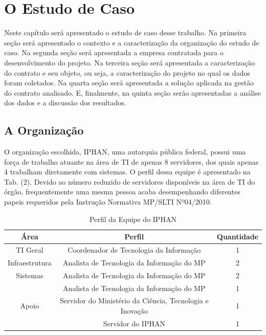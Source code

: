 \chapter[O Estudo de Caso]{O Estudo de Caso}

Neste capítulo será apresentado o estudo de caso desse trabalho. Na primeira seção será apresentado o contexto e a caracterização da organização do estudo de caso. Na segunda seção será apresentada a empresa contratada para o desenvolvimento do projeto. Na terceira seção será apresentada a caracterização do contrato e seu objeto, ou seja, a caracterização do projeto no qual os dados foram coletados. Na quarta seção será apresentada a solução aplicada na gestão do contrato analisado. E, finalmente, na quinta seção serão apresentadas a análise dos dados e a discussão dos resultados.

\section[A Organização]{A Organização}

O organização escolhida, IPHAN, uma autarquia pública federal, possui uma força de trabalho atuante na área de TI de apenas 8 servidores, dos quais apenas 4 trabalham diretamente com sistemas. O perfil dessa equipe é apresentado na Tab. (2). Devido ao número reduzido de servidores disponíveis na área de TI do órgão, frequentemente uma mesma pessoa acaba desempenhando diferentes papeis requeridos pela Instrução Normativa MP/SLTI Nº04/2010.

\begin{table}[H]
\center
\footnotesize
\begin{tabular}{|c|c|c|}
\hline
\textbf{Área}          & \textbf{Perfil}   & \textbf{Quantidade} \\ \hline
TI Geral               & Coordenador de Tecnologia da Informação   & 1                   \\ \hline
Infraestrutura         & Analista de Tecnologia da Informação do MP   & 2                   \\ \hline
Sistemas               & Analista de Tecnologia da Informação do MP   & 2                   \\ \hline
\multirow{3}{*}{Apoio} & Analista de Tecnologia da Informação do MP   & 1                   \\ \cline{2-3} 
\multicolumn{1}{|l|}{} & Servidor do Ministério da Ciência, Tecnologia e Inovação & 1                   \\ \cline{2-3} 
\multicolumn{1}{|l|}{} & Servidor do IPHAN & 1                   \\ \hline
\end{tabular}
\caption{Perfil da Equipe do IPHAN}
\end{table}

